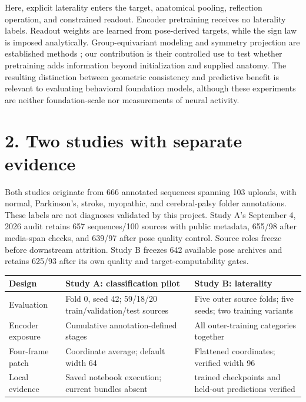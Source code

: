 \documentclass{article}
\begin{document}
Here, explicit laterality enters the target, anatomical pooling,
reflection operation, and constrained readout. Encoder pretraining
receives no laterality labels. Readout weights are learned from
pose-derived targets, while the sign law is imposed analytically.
Group-equivariant modeling and symmetry projection are established
methods \citep{cohen2016gcnn, bronstein2021gdl}; our contribution is
their controlled use to test whether pretraining adds information beyond
initialization and supplied anatomy. The resulting distinction between
geometric consistency and predictive benefit is relevant to evaluating
behavioral foundation models, although these experiments are neither
foundation-scale nor measurements of neural activity.

\section{2. Two studies with separate
evidence}\label{two-studies-with-separate-evidence}

Both studies originate from 666 annotated sequences spanning 103
uploads, with normal, Parkinson's, stroke, myopathic, and cerebral-palsy
folder annotations. These labels are not diagnoses validated by this
project. Study A's September 4, 2026 audit retains 657 sequences/100
sources with public metadata, 655/98 after media-span checks, and 639/97
after pose quality control. Source roles freeze before downstream
attrition. Study B freezes 642 available pose archives and retains
625/93 after its own quality and target-computability gates.

{\def\LTcaptype{none} %
\begin{longtable}[]{@{}
  >{\raggedright\arraybackslash}p{}
  >{\raggedright\arraybackslash}p{}
  >{\raggedright\arraybackslash}p{}@{}}
\toprule\noalign{}
\begin{minipage}[b]{\linewidth}\raggedright
Design
\end{minipage} & \begin{minipage}[b]{\linewidth}\raggedright
Study A: classification pilot
\end{minipage} & \begin{minipage}[b]{\linewidth}\raggedright
Study B: laterality
\end{minipage} \\
\midrule\noalign{}
\endhead
\bottomrule\noalign{}
\endlastfoot
Evaluation & Fold 0, seed 42; 59/18/20 train/validation/test sources &
Five outer source folds; five seeds; two training variants \\
Encoder exposure & Cumulative annotation-defined stages & All
outer-training categories together \\
Four-frame patch & Coordinate average; default width 64 & Flattened
coordinates; verified width 96 \\
Local evidence & Saved notebook execution; current bundles absent & 50
trained checkpoints and held-out predictions verified \\
\end{longtable}
}
\end{document}
